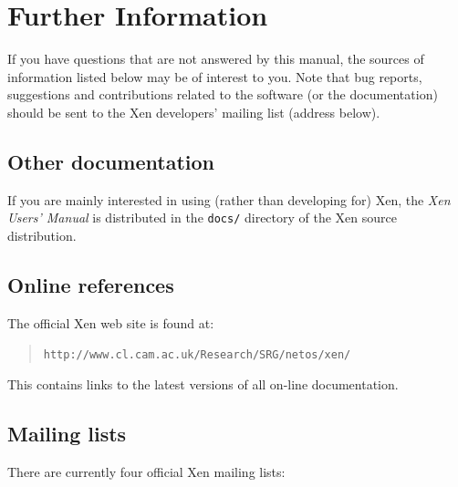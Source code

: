 \documentclass[11pt,twoside,final,openright]{report}
\begin{document}


\chapter{Further Information} 


If you have questions that are not answered by this manual, the
sources of information listed below may be of interest to you.  Note
that bug reports, suggestions and contributions related to the
software (or the documentation) should be sent to the Xen developers'
mailing list (address below).

\section{Other documentation}

If you are mainly interested in using (rather than developing for)
Xen, the {\em Xen Users' Manual} is distributed in the {\tt docs/}
directory of the Xen source distribution.  


\section{Online references}

The official Xen web site is found at:
\begin{quote}
{\tt http://www.cl.cam.ac.uk/Research/SRG/netos/xen/}
\end{quote}

This contains links to the latest versions of all on-line 
documentation. 

\section{Mailing lists}

There are currently four official Xen mailing lists:
\end{document}
